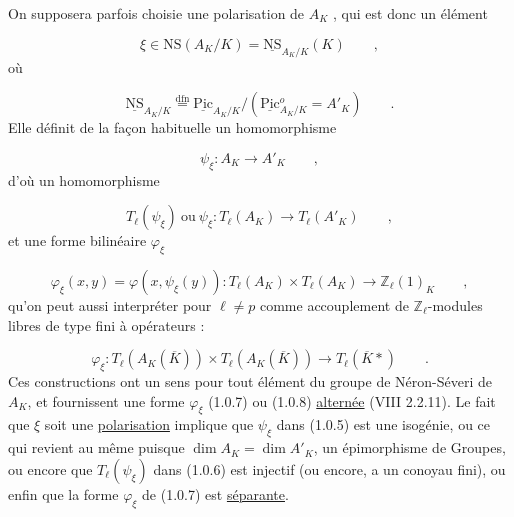 
On supposera parfois choisie une polarisation de $A_K$ , qui est donc un élément

\begin{equation}\tag{1.0.4}
\xi \in \mathrm{NS}(A_K/K) = \underline{\mathrm{NS}}_{A_K/K}(K) \qquad ,
\end{equation}
où

\begin{equation*}
\underline{\mathrm{NS}}_{A_K/K} \overset{\mathrm{dfn}}{=} \underline{\mathrm{Pic}}_{A_K/K} / (\underline{\mathrm{Pic}}{}^{o}_{A_K/K} = A'_K) \qquad .
\end{equation*}
Elle définit de la façon habituelle un homomorphisme

\begin{equation}\tag{1.0.5}
\psi_\xi : A_K \longrightarrow A'_K \qquad ,
\end{equation}
d'où un homomorphisme

\begin{equation}\tag{1.0.6}
T_\ell(\psi_\xi) \ \text{ou} \ \psi_\xi : T_\ell(A_K) \longrightarrow T_\ell(A'_K) \qquad ,
\end{equation}
et une forme bilinéaire $\varphi_\xi$

\begin{equation}\tag{1.0.7}
\varphi_\xi(x,y) = \varphi(x,\psi_\xi(y)) : T_\ell(A_K) \times T_\ell(A_K) \longrightarrow \mathbb{Z}_\ell(1)_K \qquad ,
\end{equation}
qu'on peut aussi interpréter pour $\ell \neq p$ comme accouplement de $\mathbb{Z}_\ell$-modules libres de type fini à opérateurs :

\begin{equation}\tag{1.0.8}
\varphi_\xi : T_\ell(A_K(\overline{K})) \times T_\ell(A_K(\overline{K})) \longrightarrow T_\ell(\overline{K}*) \qquad .
\end{equation}
Ces constructions ont un sens pour tout élément du groupe de Néron-Séveri de $A_K$, et fournissent une forme $\varphi_\xi$ (1.0.7) ou (1.0.8) \underline{alternée} (VIII 2.2.11). Le fait que $\xi$ soit une \underline{polarisation} implique que $\psi_\xi$ dans (1.0.5) est une isogénie, ou ce qui revient au même puisque $\dim A_K = \dim A'_K$, un épimorphisme de Groupes, ou encore que $T_\ell(\psi_\xi)$ dans (1.0.6) est injectif (ou encore, a un conoyau fini), ou enfin que la forme $\varphi_\xi$ de (1.0.7) est \underline{séparante}.



